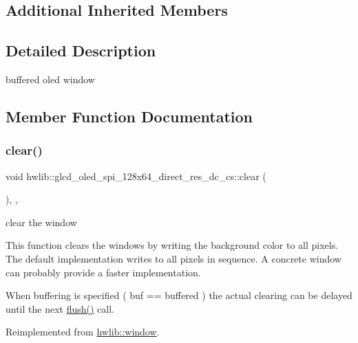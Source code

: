 \subsection*{Additional Inherited Members}


\subsection{Detailed Description}
buffered oled window 

\subsection{Member Function Documentation}
\mbox{\label{classhwlib_1_1glcd__oled__spi__128x64__direct__res__dc__cs_afebf8245a39c31859ef21eae3d9deb69}} 
\subsubsection{\texorpdfstring{clear()}{clear()}}
{\footnotesize\ttfamily void hwlib\+::glcd\+\_\+oled\+\_\+spi\+\_\+128x64\+\_\+direct\+\_\+res\+\_\+dc\+\_\+cs\+::clear (\begin{DoxyParamCaption}{ }\end{DoxyParamCaption})\hspace{0.3cm}{\ttfamily [inline]}, {\ttfamily [override]}, {\ttfamily [virtual]}}



clear the window 

This function clears the windows by writing the background color to all pixels. The default implementation writes to all pixels in sequence. A concrete window can probably provide a faster implementation.

When buffering is specified ( buf == buffered ) the actual clearing can be delayed until the next \hyperlink{classhwlib_1_1glcd__oled__spi__128x64__direct__res__dc__cs_ada856fccd0e72f8e95172e1aa901024c}{flush()} call. 

Reimplemented from \hyperlink{classhwlib_1_1window_a5e781163353ce26cb4dc5b2cbe40ad05}{hwlib\+::window}.

